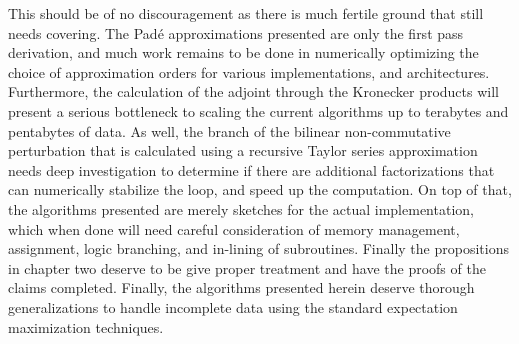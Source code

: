 This should be of no discouragement as there is much fertile ground that still needs
covering. The Pad\'{e} approximations presented are only the first pass derivation, and
much work remains to be done in numerically optimizing the choice of approximation orders
for various implementations, and architectures. Furthermore, the calculation of the adjoint
through the Kronecker products will present a serious bottleneck to scaling the current
algorithms up to terabytes and pentabytes of data. As well, the branch of the bilinear 
non-commutative perturbation that is calculated using a recursive Taylor series 
approximation needs deep investigation to determine if there are additional factorizations 
that can numerically stabilize the loop, and speed up the computation. On top of that, the 
algorithms presented are merely sketches for the actual implementation, which when done will 
need careful consideration of memory management, assignment, logic branching, and in-lining 
of subroutines. Finally the propositions in chapter two deserve to be give proper treatment 
and have the proofs of the claims completed. Finally, the algorithms presented herein 
deserve thorough generalizations to handle incomplete data using the standard expectation 
maximization techniques.